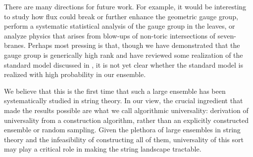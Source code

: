 \documentclass[aps,prl,twocolumn, superscriptaddress,groupedaddress,nofootinbib]{revtex4-1}
\newcommand{\XXX}[3]{}
\begin{document}
There are many directions for future work. For example, it would be
interesting to study how flux could break or further enhance the geometric gauge group,
perform a systematic statistical analysis of the gauge group in the leaves, or analyze
physics that arises from blow-ups of non-toric intersections of seven-branes. 
Perhaps most pressing is that, though we have demonstrated that the gauge group is generically 
high rank and have reviewed some realization of the standard model discussed in \cite{Grassi:2014zxa}, it is not yet clear whether the standard model is realized with high probability in our ensemble.


We believe that this is the first time that such a large ensemble has been systematically
studied in string theory. In our view, the crucial ingredient that made the results
possible are what we call algorithmic
universality: derivation of universality from a construction algorithm, rather than
an explicitly constructed ensemble or random sampling. Given the plethora of large ensembles in string theory
and the infeasibility of constructing all of them, universality of this sort may play
a critical role in making the string landscape tractable.

\end{document}
